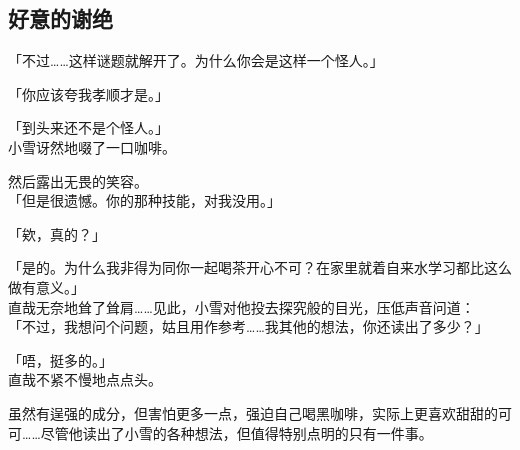 \subsection{好意的谢绝}

「不过……这样谜题就解开了。为什么你会是这样一个怪人。」

「你应该夸我孝顺才是。」

「到头来还不是个怪人。」\\

小雪讶然地啜了一口咖啡。

然后露出无畏的笑容。\\

「但是很遗憾。你的那种技能，对我没用。」

「欸，真的？」

「是的。为什么我非得为同你一起喝茶开心不可？在家里就着自来水学习都比这么做有意义。」\\

直哉无奈地耸了耸肩……见此，小雪对他投去探究般的目光，压低声音问道：\\

「不过，我想问个问题，姑且用作参考……我其他的想法，你还读出了多少？」

「唔，挺多的。」\\

直哉不紧不慢地点点头。

虽然有逞强的成分，但害怕更多一点，强迫自己喝黑咖啡，实际上更喜欢甜甜的可可……尽管他读出了小雪的各种想法，但值得特别点明的只有一件事。\\

